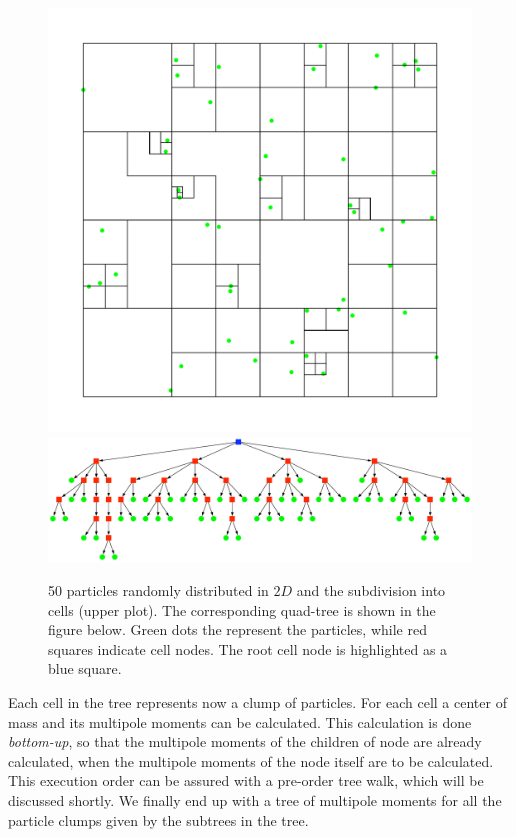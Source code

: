 \begin{figure}[htbp]
\begin{center}
\includegraphics[scale=0.6]{06quadtree50_xy.pdf}
\includegraphics[scale=0.3]{06quadtree50.pdf}
\caption{50 particles randomly distributed in $2D$ and the subdivision into cells (upper plot). The corresponding quad-tree is shown in the figure below. Green dots the represent the particles, while red squares indicate cell nodes. The root cell node is highlighted as a blue square.}
\label{ch02_grav02_fig02}
\end{center}
\end{figure}

Each cell in the tree represents now a clump of particles. For each cell a center of mass and its multipole moments can be calculated. This calculation is done \emph{bottom-up}, so that the multipole moments of the children of node are already calculated, when the multipole moments of the node itself are to be calculated. This execution order can be assured with a pre-order tree walk, which will be discussed shortly. We finally end up with a tree of multipole moments for all the particle clumps given by the subtrees in the tree.

